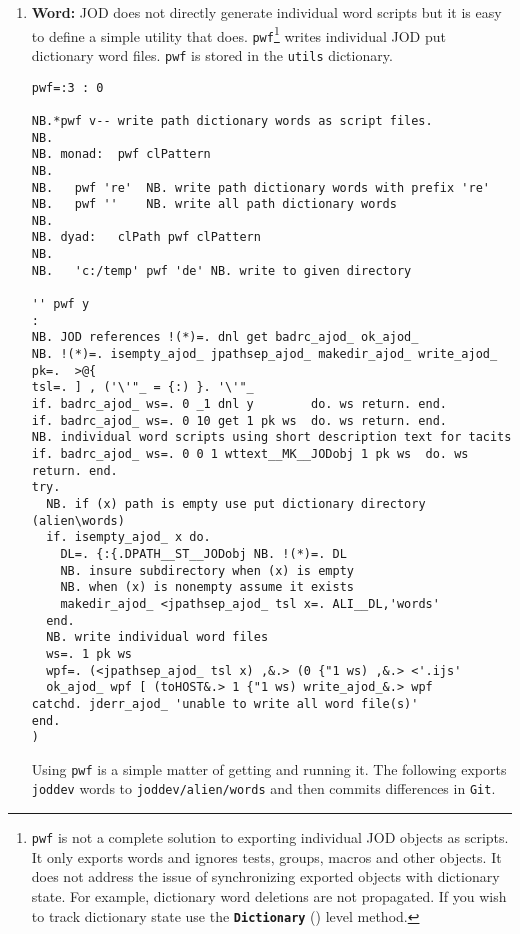 \begin{enumerate}
\item \textbf{Word:} JOD does not directly generate individual word scripts 
but it is easy to define
a simple utility that does. \texttt{pwf}\footnote{
\texttt{pwf} is not a complete solution to exporting 
individual JOD objects as scripts. It only exports words
 and ignores tests, groups, macros and other objects.
It does not address the issue of synchronizing exported
objects with dictionary state. For example, dictionary word
deletions are not propagated. If you wish to track 
dictionary state use the \textbf{\texttt{Dictionary}} (\pageref{it:dictlev})
level method.}
writes individual JOD put dictionary
word files. \texttt{pwf} is stored in the \texttt{utils} dictionary.

\begin{lstlisting}[frame=single,framerule=0pt,basicstyle=\ttfamily\footnotesize]
pwf=:3 : 0

NB.*pwf v-- write path dictionary words as script files.
NB.
NB. monad:  pwf clPattern
NB.
NB.   pwf 're'  NB. write path dictionary words with prefix 're'
NB.   pwf ''    NB. write all path dictionary words
NB.
NB. dyad:   clPath pwf clPattern
NB.
NB.   'c:/temp' pwf 'de' NB. write to given directory

'' pwf y
:
NB. JOD references !(*)=. dnl get badrc_ajod_ ok_ajod_ 
NB. !(*)=. isempty_ajod_ jpathsep_ajod_ makedir_ajod_ write_ajod_
pk=.  >@{                        
tsl=. ] , ('\'"_ = {:) }. '\'"_  
if. badrc_ajod_ ws=. 0 _1 dnl y        do. ws return. end.
if. badrc_ajod_ ws=. 0 10 get 1 pk ws  do. ws return. end.
NB. individual word scripts using short description text for tacits
if. badrc_ajod_ ws=. 0 0 1 wttext__MK__JODobj 1 pk ws  do. ws return. end.
try.
  NB. if (x) path is empty use put dictionary directory (alien\words)
  if. isempty_ajod_ x do.
    DL=. {:{.DPATH__ST__JODobj NB. !(*)=. DL
    NB. insure subdirectory when (x) is empty
    NB. when (x) is nonempty assume it exists
    makedir_ajod_ <jpathsep_ajod_ tsl x=. ALI__DL,'words'
  end.
  NB. write individual word files
  ws=. 1 pk ws
  wpf=. (<jpathsep_ajod_ tsl x) ,&.> (0 {"1 ws) ,&.> <'.ijs'
  ok_ajod_ wpf [ (toHOST&.> 1 {"1 ws) write_ajod_&.> wpf
catchd. jderr_ajod_ 'unable to write all word file(s)'
end.
)
\end{lstlisting}

Using \texttt{pwf} is a simple matter of getting and running it.  The following
exports  \texttt{joddev} words  to \verb|joddev/alien/words| 
and then commits differences in \texttt{Git}.


\end{enumerate}

